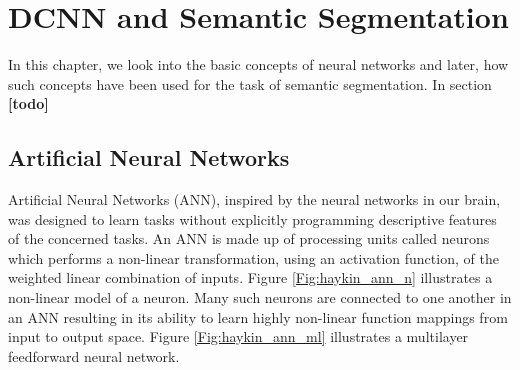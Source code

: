 
\chapter{DCNN and Semantic Segmentation}

	In this chapter, we look into the basic concepts of neural networks and later, how such concepts have been used for the task of semantic segmentation. In section  \textbf{[todo]}

\section{Artificial Neural Networks}

Artificial Neural Networks (ANN), inspired by the neural networks in our brain, was designed to learn tasks without explicitly programming descriptive features of the concerned tasks. An ANN is made up of processing units called neurons which performs a non-linear transformation, using an activation function, of the weighted linear combination of inputs. Figure \ref{Fig:haykin_ann_n} illustrates a non-linear model of a neuron. Many such neurons are connected to one another in an ANN resulting in its ability to learn highly non-linear function mappings from input to output space. Figure \ref{Fig:haykin_ann_ml} illustrates a multilayer feedforward neural network.

